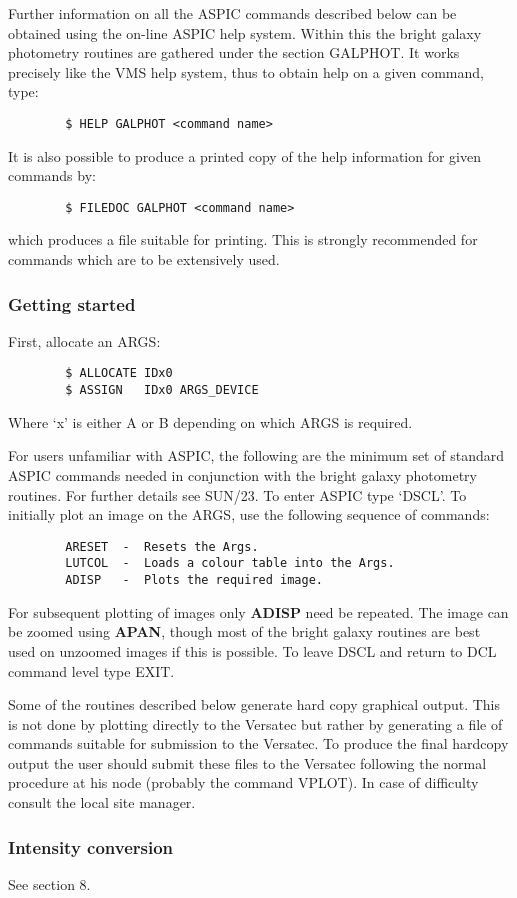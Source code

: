 Further information on all the ASPIC commands described below can be obtained
using the on-line ASPIC help system.
Within this the bright galaxy photometry routines are gathered under the
section GALPHOT.
It works precisely like the VMS help system, thus to obtain help on a given
command, type:
\begin{verbatim}
        $ HELP GALPHOT <command name>
\end{verbatim}
It is also possible to produce a printed copy of the help information for given
commands by:
\begin{verbatim}
        $ FILEDOC GALPHOT <command name>
\end{verbatim}
which produces a file suitable for printing.
This is strongly recommended for commands which are to be extensively used.
\subsubsection {Getting started}
First, allocate an ARGS:
\begin{verbatim}
        $ ALLOCATE IDx0
        $ ASSIGN   IDx0 ARGS_DEVICE
\end{verbatim}
Where `x' is either A or B depending on which ARGS is required.

For users unfamiliar with ASPIC, the following are the minimum set of standard
ASPIC commands needed in conjunction with the bright galaxy photometry routines.
For further details see SUN/23.
To enter ASPIC type `DSCL'.
To initially plot an image on the ARGS, use the following sequence of commands:
\begin{verbatim}
        ARESET  -  Resets the Args.
        LUTCOL  -  Loads a colour table into the Args.
        ADISP   -  Plots the required image.
\end{verbatim}
For subsequent plotting of images only {\bf ADISP} need be repeated.
The image can be zoomed using {\bf APAN}, though most of the bright galaxy
routines are best used on unzoomed images if this is possible.
To leave DSCL and return to DCL command level type EXIT.

Some of the routines described below generate hard copy graphical output.
This is not done by plotting directly to the Versatec but rather by generating
a file of commands suitable for submission to the Versatec.
To produce the final hardcopy output the user should submit these files to the
Versatec following the normal procedure at his node (probably the command
VPLOT).
In case of difficulty consult the local site manager.
\subsubsection {Intensity conversion}
See section 8.
